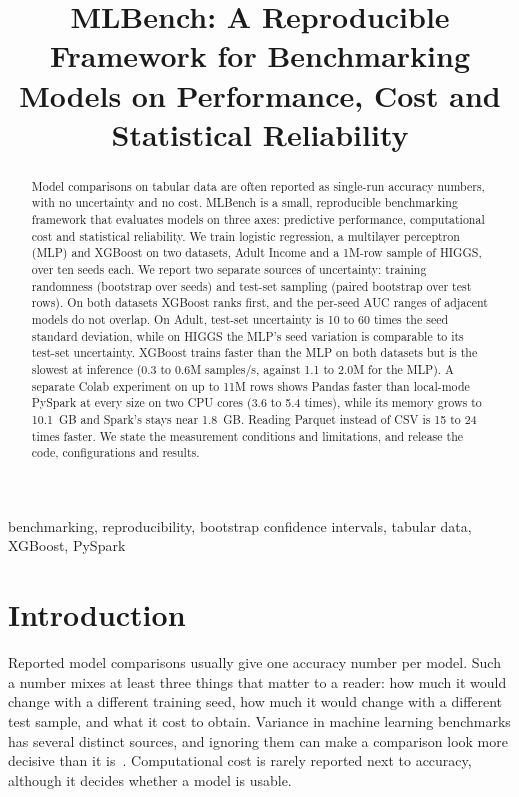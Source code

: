 \documentclass[conference]{IEEEtran}
\begin{document}
\title{MLBench: A Reproducible Framework for Benchmarking Models on Performance, Cost and Statistical Reliability}

\author{
}

\maketitle

\begin{abstract}
Model comparisons on tabular data are often reported as single-run accuracy numbers, with no uncertainty and no cost. MLBench is a small, reproducible benchmarking framework that evaluates models on three axes: predictive performance, computational cost and statistical reliability. We train logistic regression, a multilayer perceptron (MLP) and XGBoost on two datasets, Adult Income and a 1M-row sample of HIGGS, over ten seeds each. We report two separate sources of uncertainty: training randomness (bootstrap over seeds) and test-set sampling (paired bootstrap over test rows). On both datasets XGBoost ranks first, and the per-seed AUC ranges of adjacent models do not overlap. On Adult, test-set uncertainty is 10 to 60 times the seed standard deviation, while on HIGGS the MLP's seed variation is comparable to its test-set uncertainty. XGBoost trains faster than the MLP on both datasets but is the slowest at inference (0.3 to 0.6M samples/s, against 1.1 to 2.0M for the MLP). A separate Colab experiment on up to 11M rows shows Pandas faster than local-mode PySpark at every size on two CPU cores (3.6 to 5.4 times), while its memory grows to 10.1~GB and Spark's stays near 1.8~GB. Reading Parquet instead of CSV is 15 to 24 times faster. We state the measurement conditions and limitations, and release the code, configurations and results.
\end{abstract}

\begin{IEEEkeywords}
benchmarking, reproducibility, bootstrap confidence intervals, tabular data, XGBoost, PySpark
\end{IEEEkeywords}

\section{Introduction}
Reported model comparisons usually give one accuracy number per model. Such a number mixes at least three things that matter to a reader: how much it would change with a different training seed, how much it would change with a different test sample, and what it cost to obtain. Variance in machine learning benchmarks has several distinct sources, and ignoring them can make a comparison look more decisive than it is~\cite{bouthillier2021}. Computational cost is rarely reported next to accuracy, although it decides whether a model is usable.
\end{document}
